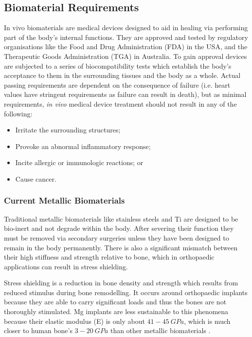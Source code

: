 \documentclass[draft,a4paper,12pt,oneside]{report}%
\begin{document}
\subsection{Biomaterial Requirements} 
In vivo biomaterials are medical devices designed to aid in healing via performing part of the body's internal functions. They are approved and tested by regulatory organisations like the Food and Drug Administration (FDA) in the USA, and the Therapeutic Goods Administration (TGA) in Australia. To gain approval devices are subjected to a series of biocompatibility tests which establish the body's acceptance to them in the surrounding tissues and the body as a whole. Actual passing requirements are dependent on the consequence of failure (i.e. heart values have stringent requirements as failure can result in death), but as minimal requirements, \textit{in vivo} medical device treatment should not result in any of the following:

\begin{itemize}
	\item Irritate the surrounding structures;
	\item Provoke an abnormal inflammatory response;
	\item Incite allergic or immunologic reactions; or
	\item Cause cancer.  
\end{itemize}

\subsubsection{Current Metallic Biomaterials}
Traditional metallic biomaterials like stainless steels and Ti are designed to be bio-inert and not degrade within the body. After severing their function they must be removed via secondary surgeries unless they have been designed to remain in the body permanently. There is also a significant mismatch between their high stiffness and strength relative to bone, which in orthopaedic applications can result in stress shielding.

Stress shielding is a reduction in bone density and strength which results from reduced stimulus during bone remodelling. It occurs around orthopaedic implants because they are able to carry significant loads and thus the bones are not thoroughly stimulated. Mg implants are less sustainable to this phenomena because their elastic modulus (E) is only about $41 - 45~ GPa$, which is much closer to human bone's $3 - 20~ GPa$ than other metallic biomaterials \cite{Wang2012, Zberg2009}.
\end{document}
